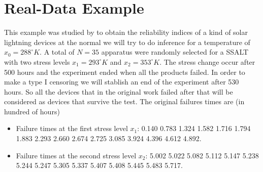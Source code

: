 \documentclass{article}
\begin{document}
\section{Real-Data Example \label{sec:example}}

This example was studied by \cite{han2015} to obtain the reliability indices of a kind of solar lightning devices at the normal we will try to do inference for a temperature of $x_0=288^\circ K$. A total of $N = 35$ apparatus were randomly selected for a SSALT with two stress levels $x_1 = 293^\circ K$ and $x_2 = 353^\circ K$. The stress change occur after 500 hours and the experiment ended when all the products failed. In order to make a type I censoring we will stablish an end of the experiment after 530 hours. So all the devices that in the original work failed after that will be considered as devices that survive the test. The original failures times are (in hundred of hours)

\begin{itemize}
  \item Failure times at the first stress level $x_1$:  0.140 0.783 1.324 1.582 1.716 1.794 1.883 2.293 2.660 2.674 2.725 3.085 3.924 4.396 4.612 4.892.
  \item Failure times at the second stress level $x_2$: 5.002 5.022 5.082 5.112 5.147 5.238 5.244 5.247 5.305 5.337 5.407 5.408 5.445 5.483 5.717.
\end{itemize}
\end{document}
